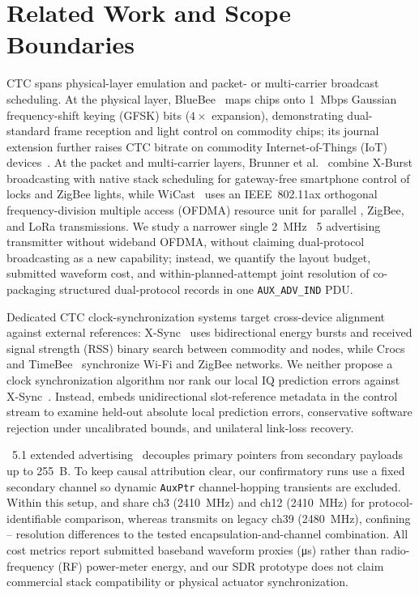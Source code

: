 \section{Related Work and Scope Boundaries}\label{sec:related}

CTC spans physical-layer emulation and packet- or multi-carrier broadcast scheduling. At the physical layer, BlueBee~\cite{jiang2017bluebee} maps \stdfour{} chips onto \SI{1}{Mbps} \ble{} Gaussian frequency-shift keying (GFSK) bits ($4\times$ expansion), demonstrating dual-standard frame reception and light control on commodity chips; its journal extension further raises CTC bitrate on commodity Internet-of-Things (IoT) devices~\cite{jiang2019boosting}. At the packet and multi-carrier layers, Brunner et al.~\cite{brunner2021leveraging} combine X-Burst broadcasting with native stack scheduling for gateway-free smartphone control of \ble{} locks and ZigBee lights, while WiCast~\cite{xia2025wicast} uses an IEEE~802.11ax orthogonal frequency-division multiple access (OFDMA) resource unit for parallel \ble{}, ZigBee, and LoRa transmissions. We study a narrower single \SI{2}{MHz} \ble{}~5 advertising transmitter without wideband OFDMA, without claiming dual-protocol broadcasting as a new capability; instead, we quantify the layout budget, submitted waveform cost, and within-planned-attempt joint resolution of co-packaging structured dual-protocol records in one \texttt{AUX\_ADV\_IND} PDU.

Dedicated CTC clock-synchronization systems target cross-device alignment against external references: X-Sync~\cite{hofmann2021xsync} uses bidirectional energy bursts and received signal strength (RSS) binary search between commodity \ble{} and \stdfour{} nodes, while Crocs~\cite{yu2018crocs} and TimeBee~\cite{gao2023timebee} synchronize Wi-Fi and ZigBee networks. We neither propose a clock synchronization algorithm nor rank our local IQ prediction errors against X-Sync~\cite{hofmann2021xsync}. Instead, \proto{} embeds unidirectional slot-reference metadata in the control stream to examine held-out absolute local prediction errors, conservative software rejection under uncalibrated bounds, and unilateral link-loss recovery.

\ble{}~5.1 extended advertising~\cite{bluetooth_core51} decouples primary pointers from secondary payloads up to \SI{255}{B}. To keep causal attribution clear, our confirmatory runs use a fixed secondary channel so dynamic \texttt{AuxPtr} channel-hopping transients are excluded. Within this setup, \modejc{} and \modesc{} share \ble{} ch3 (\SI{2410}{MHz}) and \stdfour{} ch12 (\SI{2410}{MHz}) for protocol-identifiable comparison, whereas \modelc{} transmits \ble{} on legacy ch39 (\SI{2480}{MHz}), confining \modejc{}--\modelc{} resolution differences to the tested encapsulation-and-channel combination. All cost metrics report submitted baseband waveform proxies (\si{\micro\second}) rather than radio-frequency (RF) power-meter energy, and our SDR prototype does not claim commercial stack compatibility or physical actuator synchronization.

